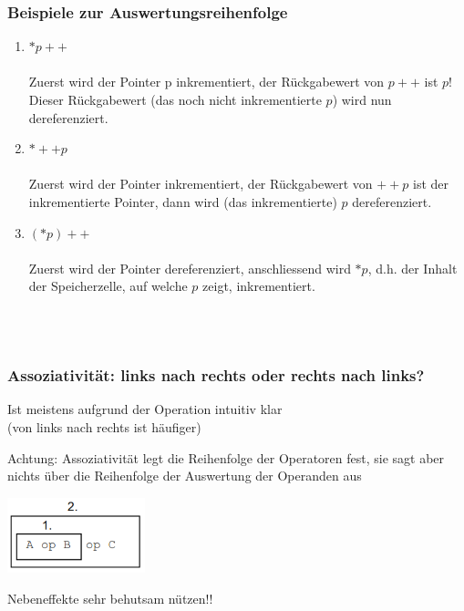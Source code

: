 			\hspace*{0.5cm}
			\begin{minipage}[t]{8 cm}
				\subsubsection{Beispiele zur Auswertungsreihenfolge}
					\begin{enumerate}
						\item $*p++$\\\\
						Zuerst wird der Pointer p inkrementiert, der Rückgabewert von $p++$ ist $p$! Dieser 
						Rückgabewert (das noch nicht inkrementierte $p$) wird nun dereferenziert.
						\item $*++p$\\\\
						Zuerst wird der Pointer inkrementiert, der Rückgabewert von $++p$ ist der inkrementierte Pointer, dann wird (das inkrementierte) $p$ dereferenziert.
						\item $(*p)++$\\\\
						Zuerst wird der Pointer dereferenziert, anschliessend wird $*p$, d.h. der Inhalt der 
						Speicherzelle, auf welche $p$ zeigt, inkrementiert.
					\end{enumerate}
			\end{minipage}\\\\
			\begin{minipage}[t]{9 cm}
				\subsubsection{Assoziativität: links nach rechts oder rechts nach links?}
					\begin{compactitem}
						\item Ist meistens aufgrund der Operation intuitiv klar\\ (von links nach rechts ist häufiger)
						\item Achtung: Assoziativität legt die
						Reihenfolge der Operatoren fest, sie sagt
						aber nichts über die Reihenfolge der Auswertung der Operanden aus
					\end{compactitem}
					\hspace*{0.7cm}
					\includegraphics[width=0.3\textwidth]{pics/assoziativitaet.png}
					\begin{compactitem}
						\item Nebeneffekte sehr behutsam nützen!! 
					\end{compactitem}
			\end{minipage}
